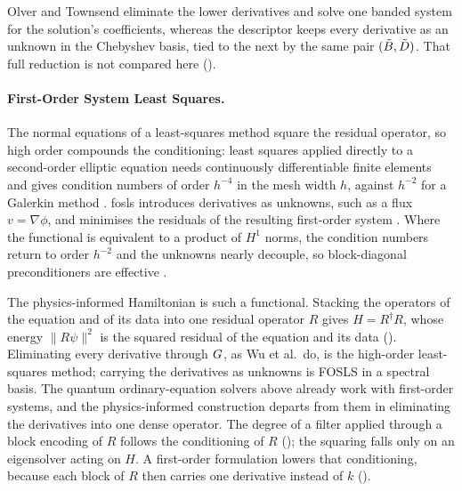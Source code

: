 Olver and Townsend eliminate the lower derivatives and solve one banded system for the solution's coefficients, whereas the descriptor keeps every derivative as an unknown in the Chebyshev basis, tied to the next by the same pair $(\tilde{B},\tilde{D})$. That full reduction is not compared here ().

\paragraph{First-Order System Least Squares.}
\label{sec:bg-fosls}

The normal equations of a least-squares method square the residual operator, so high order compounds the conditioning: least squares applied directly to a second-order elliptic equation needs continuously differentiable finite elements and gives condition numbers of order $h^{-4}$ in the mesh width $h$, against $h^{-2}$ for a Galerkin method \cite{bochevgunzburger1998review}. \Gls{fosls} introduces derivatives as unknowns, such as a flux $v=\nabla\phi$, and minimises the residuals of the resulting first-order system \cite{cai1994fosls}. Where the functional is equivalent to a product of $H^1$ norms, the condition numbers return to order $h^{-2}$ and the unknowns nearly decouple, so block-diagonal preconditioners are effective \cite{bochevgunzburger1998review,bochev2009lsfem}.

The physics-informed Hamiltonian is such a functional. Stacking the operators of the equation and of its data into one residual operator $R$ gives $H=R^\dagger R$, whose energy $\|R\psi\|^2$ is the squared residual of the equation and its data (). Eliminating every derivative through $G$, as Wu et al.\ do, is the high-order least-squares method; carrying the derivatives as unknowns is FOSLS in a spectral basis. The quantum ordinary-equation solvers above already work with first-order systems, and the physics-informed construction departs from them in eliminating the derivatives into one dense operator. The degree of a filter applied through a block encoding of $R$ follows the conditioning of $R$ (); the squaring falls only on an eigensolver acting on $H$. A first-order formulation lowers that conditioning, because each block of $R$ then carries one derivative instead of $k$ ().

